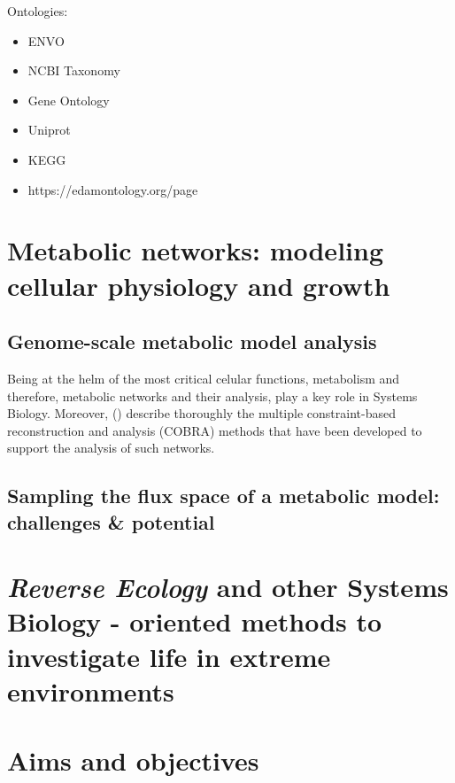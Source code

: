    Ontologies: 

   \begin{itemize}
      \item ENVO
      \item NCBI Taxonomy 
      \item Gene Ontology 
      \item Uniprot
      \item KEGG
      \item https://edamontology.org/page
   \end{itemize}



\section{Metabolic networks: modeling  cellular physiology and growth}

   \subsection{Genome-scale metabolic model analysis}



      Being at the helm of the most critical celular functions, 
      metabolism and therefore, metabolic networks and their analysis, 
      play a key role in Systems Biology. 
      Moreover, \citeauthor{lewis2012constraining} (\citeyear{lewis2012constraining}) 
      describe thoroughly the multiple constraint-based reconstruction and analysis (COBRA) methods 
      that have been developed to support the analysis of such networks. 
   \subsection{Sampling the flux space of a metabolic model: challenges \& potential}



\section{\textit{Reverse Ecology} and other Systems Biology - oriented methods to investigate life in extreme environments}




\section{Aims and objectives}

